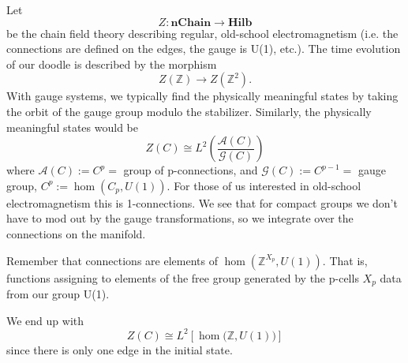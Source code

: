 \documentclass{amsart}
\numberwithin{equation}{section}
\begin{document}
Let 
\begin{equation}%
Z:\mathbf{nChain}\to\mathbf{Hilb}
\end{equation}
be the chain field theory describing regular, old-school
electromagnetism (i.e. the connections are defined on the edges,
the gauge is U(1), etc.). The time evolution of our doodle is
described by the morphism
\begin{equation}%
Z(\mathbb{Z})\to Z(\mathbb{Z}^{2}).
\end{equation}
With gauge systems, we typically find the physically meaningful
states by taking the orbit of the gauge group modulo the
stabilizer. Similarly, the physically meaningful states would be
\begin{equation}%
Z(C)\cong L^{2}\left(\frac{\mathcal{A}(C)}{\mathcal{G}(C)}\right)
\end{equation}
where $\mathcal{A}(C):=C^{p}=$ group of p-connections, and
$\mathcal{G}(C):=C^{p-1}=$ gauge group,
$C^{p}:=\hom(C_{p},U(1))$. For those of us interested in
old-school electromagnetism this is 1-connections. We see that
for compact groups we don't have to mod out by the gauge
transformations, so we integrate over the connections on the
manifold.

\begin{rmk}
Remember that connections are elements of
$\hom(\mathbb{Z}^{X_{p}},U(1))$. That is, functions assigning to
elements of the free group generated by the p-cells $X_{p}$ data
from our group U(1).
\end{rmk}

We end up with
\begin{equation}%
Z(C)\cong L^{2}\left[\hom\Big(\mathbb{Z},U(1)\Big)\right]
\end{equation}
since there is only one edge in the initial state.
\end{document}
